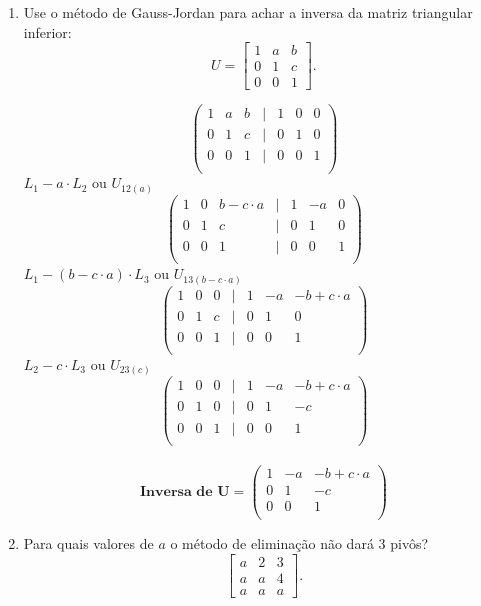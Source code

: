 \documentclass[leqno]{article}
\begin{document}
\begin{enumerate}
		\item Use o método de Gauss-Jordan para achar a inversa da matriz triangular inferior:
		$$U = \begin{bmatrix} 1 & a & b  \\
			0 & 1 & c  \\
			0 & 0 & 1 
		\end{bmatrix}.$$
		
		\begin{sol} 
			$$\begin{pmatrix}
				1 & a & b & | & 1 & 0 & 0\\
				0 & 1 & c & | & 0 & 1 & 0\\
				0 & 0 & 1 & | & 0 & 0 & 1\\
			\end{pmatrix}$$
		$L_1 - a \cdot L_2$ ou $U_{12(a)}$
			$$\begin{pmatrix}
				1 & 0 & b - c \cdot a& | & 1 & -a & 0\\
				0 & 1 & c & | & 0 & 1 & 0\\
				0 & 0 & 1 & | & 0 & 0 & 1\\
			\end{pmatrix}$$
		$L_1 - (b - c\cdot a) \cdot L_3$ ou $U_{13(b - c \cdot a)}$
		$$\begin{pmatrix}
			1 & 0 & 0& | & 1 & -a & -b + c \cdot a\\
			0 & 1 & c & | & 0 & 1 & 0\\
			0 & 0 & 1 & | & 0 & 0 & 1\\
		\end{pmatrix}$$
		$L_2 - c\cdot L_3$ ou $U_{23(c)}$
		$$\begin{pmatrix}
			1 & 0 & 0& | & 1 & -a & -b + c \cdot a\\
			0 & 1 & 0 & | & 0 & 1 & -c\\
			0 & 0 & 1 & | & 0 & 0 & 1\\
		\end{pmatrix}$$\\
		$$\textbf{Inversa de U} = \begin{pmatrix}
			 1 & -a & -b + c \cdot a\\
			 0 & 1 & -c\\
			 0 & 0 & 1\\
		\end{pmatrix}$$
			
		\end{sol} 
		\newpage
		\item Para quais valores de $a$ o método de eliminação não dará 3 pivôs?
		$$\begin{bmatrix} 
			a & 2 & 3  \\
			a & a & 4  \\
			a & a & a 
		\end{bmatrix}.$$
		

\end{enumerate}
\end{document}
